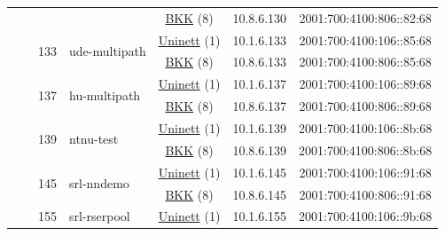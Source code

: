 \begin{small}
\begin{center}
\begin{longtable}{|c|c|c|c|c|c|c|c|}
  &  &  &  & \multicolumn{2}{|c|}{\tiny{\href{http://bkk.no}{BKK} (8)}} & \tiny{10.8.6.130} & \tiny{2001:700:4100:806::82:68} \\* \cline{3-3}\cline{4-4}\cline{5-5}\cline{6-6}\cline{7-7}\cline{8-8}
  &  & \multirow{2}{*}{\tiny{133}} & \multicolumn{1}{|l|}{\multirow{2}{*}{\tiny{ude-multipath}}} & \multicolumn{2}{|c|}{\tiny{\href{https://www.uninett.no}{Uninett} (1)}} & \tiny{10.1.6.133} & \tiny{2001:700:4100:106::85:68} \\* \cline{5-5}\cline{6-6}\cline{7-7}\cline{8-8}
  &  &  &  & \multicolumn{2}{|c|}{\tiny{\href{http://bkk.no}{BKK} (8)}} & \tiny{10.8.6.133} & \tiny{2001:700:4100:806::85:68} \\* \cline{3-3}\cline{4-4}\cline{5-5}\cline{6-6}\cline{7-7}\cline{8-8}
  &  & \multirow{2}{*}{\tiny{137}} & \multicolumn{1}{|l|}{\multirow{2}{*}{\tiny{hu-multipath}}} & \multicolumn{2}{|c|}{\tiny{\href{https://www.uninett.no}{Uninett} (1)}} & \tiny{10.1.6.137} & \tiny{2001:700:4100:106::89:68} \\* \cline{5-5}\cline{6-6}\cline{7-7}\cline{8-8}
  &  &  &  & \multicolumn{2}{|c|}{\tiny{\href{http://bkk.no}{BKK} (8)}} & \tiny{10.8.6.137} & \tiny{2001:700:4100:806::89:68} \\* \cline{3-3}\cline{4-4}\cline{5-5}\cline{6-6}\cline{7-7}\cline{8-8}
  &  & \multirow{2}{*}{\tiny{139}} & \multicolumn{1}{|l|}{\multirow{2}{*}{\tiny{ntnu-test}}} & \multicolumn{2}{|c|}{\tiny{\href{https://www.uninett.no}{Uninett} (1)}} & \tiny{10.1.6.139} & \tiny{2001:700:4100:106::8b:68} \\* \cline{5-5}\cline{6-6}\cline{7-7}\cline{8-8}
  &  &  &  & \multicolumn{2}{|c|}{\tiny{\href{http://bkk.no}{BKK} (8)}} & \tiny{10.8.6.139} & \tiny{2001:700:4100:806::8b:68} \\* \cline{3-3}\cline{4-4}\cline{5-5}\cline{6-6}\cline{7-7}\cline{8-8}
  &  & \multirow{2}{*}{\tiny{145}} & \multicolumn{1}{|l|}{\multirow{2}{*}{\tiny{srl-nndemo}}} & \multicolumn{2}{|c|}{\tiny{\href{https://www.uninett.no}{Uninett} (1)}} & \tiny{10.1.6.145} & \tiny{2001:700:4100:106::91:68} \\* \cline{5-5}\cline{6-6}\cline{7-7}\cline{8-8}
  &  &  &  & \multicolumn{2}{|c|}{\tiny{\href{http://bkk.no}{BKK} (8)}} & \tiny{10.8.6.145} & \tiny{2001:700:4100:806::91:68} \\* \cline{3-3}\cline{4-4}\cline{5-5}\cline{6-6}\cline{7-7}\cline{8-8}
  &  & \multirow{2}{*}{\tiny{155}} & \multicolumn{1}{|l|}{\multirow{2}{*}{\tiny{srl-rserpool}}} & \multicolumn{2}{|c|}{\tiny{\href{https://www.uninett.no}{Uninett} (1)}} & \tiny{10.1.6.155} & \tiny{2001:700:4100:106::9b:68} \\* \cline{5-5}\cline{6-6}\cline{7-7}\cline{8-8}

\end{longtable}
\end{center}
\end{small}
